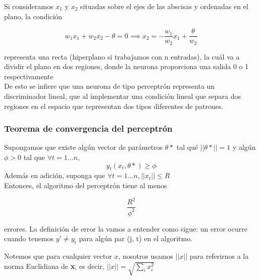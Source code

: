 Si consideramos $x_1$ y $x_2$ situadas sobre el ejes de las abscisas y
ordenadas en el plano, la condición

\begin{equation}
  w_1x_1 + w_2x_2 - \theta = 0 \implies x_2 = -\frac{w_1}{w_2}x_1 + \frac{\theta}{w_2}
\end{equation}

representa una recta (hiperplano si trabajamos con n entradas), la
cuál va a dividir el plano en dos regiones, donde la neurona
proporciona una salida 0 o 1 respectivamente\cite{martin2002redes}\\

De esto se infiere que una neurona de tipo perceptrón representa un
discriminador lineal, que al implementar una condición lineal que
separa dos regiones en el espacio que representan dos tipos diferentes
de patrones.

\subsubsection{Teorema de convergencia del perceptrón}

\theoremstyle{plain}
\begin{theorem}
Supongamos que existe algún vector de parámetros $\theta*$ tal qué
$||\theta*|| = 1$ y algún $\phi > 0$ tal que $\forall t = 1 \dots n$,
\begin{equation*}
  y_t(x_t, \theta*) \geq \phi
\end{equation*}
Además en adición, suponga que $\forall t = 1 \dots n, ||x_t|| \leq
R$\\
Entonces, el algoritmo del perceptrón tiene al menos

\begin{equation*}
  \frac{R^2}{\phi^2}
\end{equation*}

errores. La definición de error la vamos a entender como sigue: un
error ocurre cuando tenemos $y' \neq y_t$ para algún par (j, t) en el
algoritmo.
\end{theorem}

Notemos que para cualquier vector $x$, nosotros usamos $||x||$ para
referirnos a la norma Euclidiana de \textbf{x}, es decir,
$||x||=\sqrt{\displaystyle\sum_ix_i^2}$

